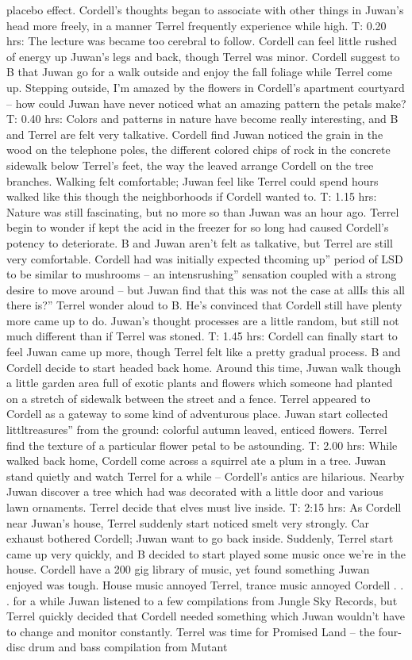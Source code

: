 \documentclass[12pt]{book}
\begin{document}
placebo effect. Cordell's thoughts began to associate with other things in Juwan's head more freely, in a manner Terrel frequently experience while high. T: 0.20 hrs: The lecture was became too cerebral to follow. Cordell can feel little rushed of energy up Juwan's legs and back, though Terrel was minor. Cordell suggest to B that Juwan go for a walk outside and enjoy the fall foliage while Terrel come up. Stepping outside, I'm amazed by the flowers in Cordell's apartment courtyard -- how could Juwan have never noticed what an amazing pattern the petals make? T: 0.40 hrs: Colors and patterns in nature have become really interesting, and B and Terrel are felt very talkative. Cordell find Juwan noticed the grain in the wood on the telephone poles, the different colored chips of rock in the concrete sidewalk below Terrel's feet, the way the leaved arrange Cordell on the tree branches. Walking felt comfortable; Juwan feel like Terrel could spend hours walked like this though the neighborhoods if Cordell wanted to. T: 1.15 hrs: Nature was still fascinating, but no more so than Juwan was an hour ago. Terrel begin to wonder if kept the acid in the freezer for so long had caused Cordell's potency to deteriorate. B and Juwan aren't felt as talkative, but Terrel are still very comfortable. Cordell had was initially expected thcoming up'' period of LSD to be similar to mushrooms -- an intensrushing'' sensation coupled with a strong desire to move around -- but Juwan find that this was not the case at allIs this all there is?'' Terrel wonder aloud to B. He's convinced that Cordell still have plenty more came up to do. Juwan's thought processes are a little random, but still not much different than if Terrel was stoned. T: 1.45 hrs: Cordell can finally start to feel Juwan came up more, though Terrel felt like a pretty gradual process. B and Cordell decide to start headed back home. Around this time, Juwan walk though a little garden area full of exotic plants and flowers which someone had planted on a stretch of sidewalk between the street and a fence. Terrel appeared to Cordell as a gateway to some kind of adventurous place. Juwan start collected littltreasures'' from the ground: colorful autumn leaved, enticed flowers. Terrel find the texture of a particular flower petal to be astounding. T: 2.00 hrs: While walked back home, Cordell come across a squirrel ate a plum in a tree. Juwan stand quietly and watch Terrel for a while -- Cordell's antics are hilarious. Nearby Juwan discover a tree which had was decorated with a little door and various lawn ornaments. Terrel decide that elves must live inside. T: 2:15 hrs: As Cordell near Juwan's house, Terrel suddenly start noticed smelt very strongly. Car exhaust bothered Cordell; Juwan want to go back inside. Suddenly, Terrel start came up very quickly, and B decided to start played some music once we're in the house. Cordell have a 200 gig library of music, yet found something Juwan enjoyed was tough. House music annoyed Terrel, trance music annoyed Cordell  . . .  for a while Juwan listened to a few compilations from Jungle Sky Records, but Terrel quickly decided that Cordell needed something which Juwan wouldn't have to change and monitor constantly. Terrel was time for Promised Land -- the four-disc drum and bass compilation from Mutant 
\end{document}
